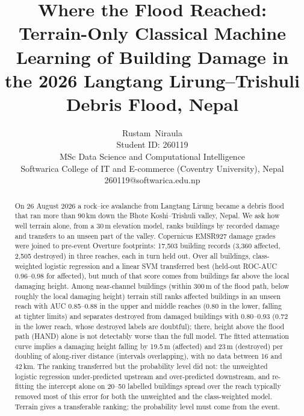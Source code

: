 \documentclass[journal,a4paper]{IEEEtran}
\begin{document}
\title{Where the Flood Reached: Terrain-Only Classical Machine Learning of Building Damage in the 2026 Langtang Lirung--Trishuli Debris Flood, Nepal}

\author{Rustam~Niraula\\ Student ID: 260119\\ MSc Data Science and Computational Intelligence\\ Softwarica College of IT and E-commerce (Coventry University), Nepal\\ 260119@softwarica.edu.np}


\maketitle

\begin{abstract}
On 26 August 2026 a rock--ice avalanche from Langtang Lirung became a debris flood that ran more than 90\,km down the Bhote Koshi--Trishuli valley, Nepal. We ask how well terrain alone, from a 30\,m elevation model, ranks buildings by recorded damage and transfers to an unseen part of the valley. Copernicus EMSR927 damage grades were joined to pre-event Overture footprints: 17,503 building records (3,360 affected, 2,505 destroyed) in three reaches, each in turn held out. Over all buildings, class-weighted logistic regression and a linear SVM transferred best (held-out ROC-AUC 0.96--0.98 for affected), but much of that score comes from buildings far above the local damaging height. Among near-channel buildings (within 300\,m of the flood path, below roughly the local damaging height) terrain still ranks affected buildings in an unseen reach with AUC 0.85--0.88 in the upper and middle reaches (0.80 in the lower, falling at tighter limits) and separates destroyed from damaged buildings with 0.80--0.93 (0.72 in the lower reach, whose destroyed labels are doubtful); there, height above the flood path (HAND) alone is not detectably worse than the full model. The fitted attenuation curve implies a damaging height falling by 19.5\,m (affected) and 23\,m (destroyed) per doubling of along-river distance (intervals overlapping), with no data between 16 and 42\,km. The ranking transferred but the probability level did not: the unweighted logistic regression under-predicted upstream and over-predicted downstream, and re-fitting the intercept alone on 20--50 labelled buildings spread over the reach typically removed most of this error for both the unweighted and the class-weighted model. Terrain gives a transferable ranking; the probability level must come from the event.
\end{abstract}
\end{document}
